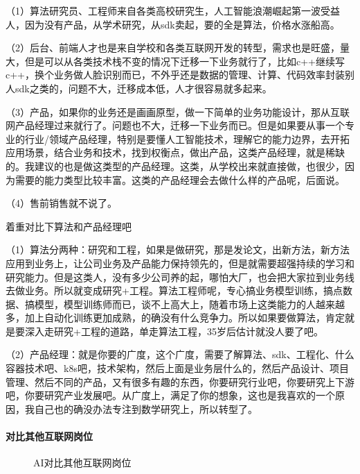 \documentclass[letterpaper,10pt,english]{sphinxmanual}
\begin{document}
（1）算法研究员、工程师来自各类高校研究生，人工智能浪潮崛起第一波受益人，因为没有产品，从学术研究，从sdk卖起，要的全是算法，价格水涨船高。

（2）后台、前端人才也是来自学校和各类互联网开发的转型，需求也是旺盛，量大，但是可以从各类技术栈不变的情况下迁移一下业务就行了，比如c++继续写c++，换个业务做人脸识别而已，不外乎还是数据的管理、计算、代码效率封装别人sdk之类的，问题不大，迁移成本低，人才很容易就多起来。

（3）产品，如果你的业务还是画画原型，做一下简单的业务功能设计，那从互联网产品经理过来就行了。问题也不大，迁移一下业务而已。但是如果要从事一个专业的行业/领域产品经理，特别是要懂人工智能技术，理解它的能力边界，去开拓应用场景，结合业务和技术，找到权衡点，做出产品，这类产品经理，就是稀缺的。我建议的也是做这类型的产品经理。这类，从学校出来就直接做，也很少，因为需要的能力类型比较丰富。这类的产品经理会去做什么样的产品呢，后面说。

（4）售前销售就不说了。

着重对比下算法和产品经理吧

（1）算法分两种：研究和工程，如果是做研究，那是发论文，出新方法，新方法应用到业务上，让公司业务及产品能力保持领先的，但是就需要超强持续的学习和研究能力。但是这类人，没有多少公司养的起，哪怕大厂，也会把大家拉到业务线去做业务。所以就变成研究+工程。算法工程师呢，专心搞业务模型训练，搞点数据、搞模型，模型训练师而已，谈不上高大上，随着市场上这类能力的人越来越多，加上自动化训练更加成熟，的确没有什么竞争力。所以如果要做算法，肯定就是要深入走研究+工程的道路，单走算法工程，35岁后估计就没人要了吧。

（2）产品经理：就是你要的广度，这个广度，需要了解算法、sdk、工程化、什么容器技术吧、k8s吧，技术架构，然后上面是业务层什么的，然后产品设计、项目管理、然后不同的产品，又有很多有趣的东西，你要研究行业吧，你要研究上下游吧，你要研究产业发展吧。从广度上，满足了你的想象，这也是我喜欢的一个原因，我自己也的确没办法专注到数学研究上，所以转型了。


\paragraph{对比其他互联网岗位}
\label{\detokenize{chapter_project/AI_talents:id7}}
\begin{figure}[H]
\centering
\capstart

\noindent{}
\caption{AI对比其他互联网岗位}\label{\detokenize{chapter_project/AI_talents:id20}}\end{figure}
\end{document}
